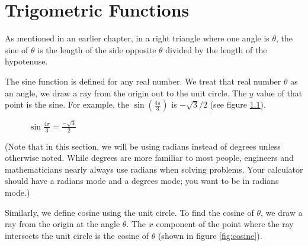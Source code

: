 \chapter{Trigometric Functions}

As mentioned in an earlier chapter, in a right triangle where one angle is $\theta$,
the sine of $\theta$ is the length of the side opposite $\theta$
divided by the length of the hypotenuse.

The sine function is defined for any real number. We treat that real number
$\theta$ as an angle, we draw a ray from the origin out to the unit
circle. The $y$ value of that point is the sine. For example,
the $\sin(\frac{4\pi}{3})$ is $-\sqrt{3}/2$ (see figure \ref{fig:sine}).

\begin{figure}[htbp]
\centering
{}
\caption{$\sin{\frac{4\pi}{3}} = \frac{-\sqrt{3}}{2}$}
\label{fig:sine}
\end{figure}


(Note that in this section, we will be using radians instead of
degrees unless otherwise noted. While degrees are more familiar to most
people, engineers and mathematicians nearly always use radians when
solving problems. Your calculator should have a radians mode and a
degrees mode; you want to be in radians mode.)

Similarly, we define cosine using the unit circle. To find the cosine
of $\theta$, we draw a ray from the origin at the angle $\theta$. The
$x$ component of the point where the ray intersects the unit circle is
the cosine of $\theta$ (shown in figure \ref{fig:cosine}).

